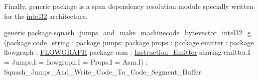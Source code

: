 Finally, generic package  is a span dependency resolution
module specially written for the \href{intel32.html}{intel32} architecture.
\begin{SML}
generic package squash_jumps_and_make_machinecode_bytevector_intel32_g
  (package code_string : 
   package jumps: 
   package props : 
   package emitter : 
   package flowgraph : \href{cluster.html}{FLOWGRAPH}
   package asm : \href{asm.html}{Instruction_Emitter}
      sharing emitter.I = Jumps.I = flowgraph.I = Props.I = Asm.I) : Squash_Jumps_And_Write_Code_To_Code_Segment_Buffer 
\end{SML}


